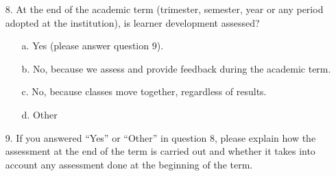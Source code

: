 \documentclass[output=paper]{langscibook}
\begin{document}
\begin{enumerate}
\item[8.]At the end of the academic term (trimester, semester, year or any period adopted at the institution), is learner development assessed?
\begin{enumerate}
\item[a.]Yes (please answer question 9).
\item[b.]No, because we assess and provide feedback during the academic term.
\item[c.]No, because classes move together, regardless of results.
\item[d.]Other
\end{enumerate}
\item[9.]If you answered “Yes” or “Other” in question 8, please explain how the assessment at the end of the term is carried out and whether it takes into account any assessment done at the beginning of the term.
\end{enumerate}
\sloppy
\printbibliography[heading=subbibliography,notkeyword=this]
\end{document}
